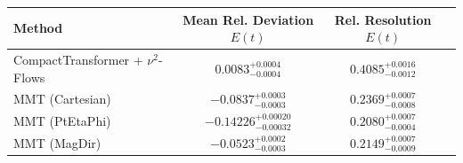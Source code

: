     \begin{tabular}{lccc}
        \toprule
        Method & Mean Rel. Deviation $E(t)$ & Rel. Resolution $E(t)$ \\
        \midrule
        CompactTransformer + $\nu^2$-Flows & $0.0083^{+0.0004}_{-0.0004}$ & $0.4085^{+0.0016}_{-0.0012}$ \\
        MMT (Cartesian) & $-0.0837^{+0.0003}_{-0.0003}$ & $0.2369^{+0.0007}_{-0.0008}$ \\
        MMT (PtEtaPhi) & $-0.14226^{+0.00020}_{-0.00032}$ & $0.2080^{+0.0007}_{-0.0004}$ \\
        MMT (MagDir) & $-0.0523^{+0.0002}_{-0.0003}$ & $0.2149^{+0.0007}_{-0.0009}$ \\
        \bottomrule
    \end{tabular}